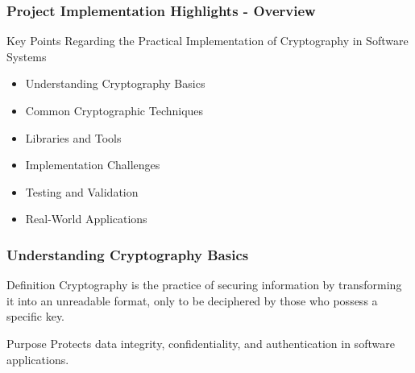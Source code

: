 \documentclass{beamer}
\begin{document}
\begin{frame}[fragile]
    \frametitle{Project Implementation Highlights - Overview}
    \begin{block}{Key Points Regarding the Practical Implementation of Cryptography in Software Systems}
        \begin{itemize}
            \item Understanding Cryptography Basics
            \item Common Cryptographic Techniques
            \item Libraries and Tools
            \item Implementation Challenges
            \item Testing and Validation
            \item Real-World Applications
        \end{itemize}
    \end{block}
\end{frame}

\begin{frame}[fragile]
    \frametitle{Understanding Cryptography Basics}
    \begin{block}{Definition}
        Cryptography is the practice of securing information by transforming it into an unreadable format, only to be deciphered by those who possess a specific key.
    \end{block}
    \begin{block}{Purpose}
        Protects data integrity, confidentiality, and authentication in software applications.
    \end{block}
\end{frame}
\end{document}
